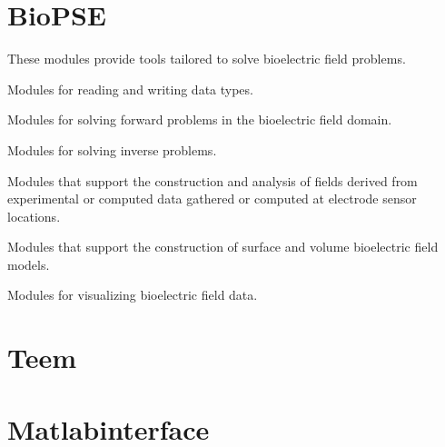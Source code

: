 \section{BioPSE}
\label{sec:biopsepackage}


These modules provide  tools tailored to solve bioelectric field
problems.

\begin{description}
   Modules for reading and writing \sr{}
  data types.
  
   Modules for solving forward
  problems in the bioelectric field domain.
  
   Modules for solving inverse
  problems.
  
   Modules that support
  the construction and analysis of fields derived from experimental or
  computed data gathered or computed at electrode sensor locations.
  
   Modules that support the
  construction of surface and volume bioelectric field models.
  
   Modules for visualizing
  bioelectric field data.
\end{description}


\section{Teem}
\label{sec:teempackage}

\begin{description}




\end{description}

\section{Matlabinterface}
\label{sec:matlabpackage}

\begin{description}


\end{description}

